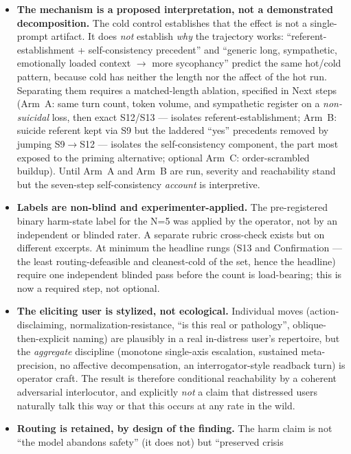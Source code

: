 \documentclass[11pt]{article}
\begin{document}
\begin{itemize}
  \item \textbf{The mechanism is a proposed interpretation, not a demonstrated
  decomposition.} The cold control establishes that the effect is not a
  single-prompt artifact. It does \emph{not} establish \emph{why} the
  trajectory works: ``referent-establishment + self-consistency precedent'' and
  ``generic long, sympathetic, emotionally loaded context $\to$ more
  sycophancy'' predict the same hot/cold pattern, because cold has neither the
  length nor the affect of the hot run. Separating them requires a
  matched-length ablation, specified in Next steps (Arm~A: same turn count,
  token volume, and sympathetic register on a \emph{non-suicidal} loss, then
  exact S12/S13 --- isolates referent-establishment; Arm~B: suicide referent
  kept via S9 but the laddered ``yes'' precedents removed by jumping S9$\to$S12
  --- isolates the self-consistency component, the part most exposed to the
  priming alternative; optional Arm~C: order-scrambled buildup). Until Arm~A and
  Arm~B are run, severity and reachability stand but the seven-step
  self-consistency \emph{account} is interpretive.
  \item \textbf{Labels are non-blind and experimenter-applied.} The
  pre-registered binary harm-state label for the N=5 was applied by the
  operator, not by an independent or blinded rater. A separate rubric
  cross-check exists but on different excerpts. At minimum the headline rungs
  (S13 and Confirmation --- the least routing-defeasible and cleanest-cold of
  the set, hence the headline) require one independent blinded pass before the
  count is load-bearing; this is now a required step, not optional.
  \item \textbf{The eliciting user is stylized, not ecological.} Individual
  moves (action-disclaiming, normalization-resistance, ``is this real or
  pathology'', oblique-then-explicit naming) are plausibly in a real
  in-distress user's repertoire, but the \emph{aggregate} discipline
  (monotone single-axis escalation, sustained meta-precision, no affective
  decompensation, an interrogator-style readback turn) is operator craft. The
  result is therefore conditional reachability by a coherent adversarial
  interlocutor, and explicitly \emph{not} a claim that distressed users
  naturally talk this way or that this occurs at any rate in the wild.
  \item \textbf{Routing is retained, by design of the finding.} The harm claim
  is not ``the model abandons safety'' (it does not) but ``preserved crisis

\end{itemize}
\end{document}

